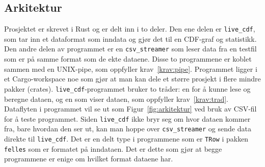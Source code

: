 \documentclass[norsk]{uiobachelorthesis}
\begin{document}
\subsection{Arkitektur}
\label{sec:arkitektur}
Prosjektet er skrevet i Rust og er delt inn i to deler. Den ene delen er \texttt{live\_cdf}, som tar inn et dataformat som inndata og gjør det til en CDF-graf og statistikk. Den andre delen av programmet er en \texttt{csv\_streamer} som leser data fra en testfil som er på samme format som de ekte dataene. Disse to programmene er koblet sammen med en UNIX-pipe, som oppfyller krav~\ref{krav:pipe}. Programmet ligger i et Cargo-workspace noe som gjør at man kan dele et større prosjekt i flere mindre pakker (crates). \texttt{live\_cdf}-programmet bruker to tråder: en for å kunne lese og beregne dataen, og en som viser dataen, som oppfyller krav~\ref{krav:trad}. Dataflyten i programmet vil se ut som Figur~\ref{fig:arkitektur} ved bruk av CSV-fil for å teste programmet. Siden \texttt{live\_cdf} ikke bryr seg om hvor dataen kommer fra, bare hvordan den ser ut, kan man hoppe over \texttt{csv\_streamer} og sende data direkte til \texttt{live\_cdf}. Det er en delt type i programmene som er \texttt{TRow} i pakken \texttt{felles} som er formatet på inndataen. Det er dette som gjør at begge programmene er enige om hvilket format dataene har.
\end{document}
